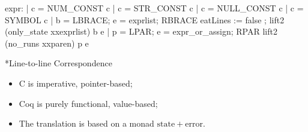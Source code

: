 \documentclass{beamer}
\begin{document}
\frame{\questiontoc}

\begin{frame}[fragile]
    \label{frame:parser}


\begin{camlcode}
expr:
  | c = NUM_CONST                       { c }
  | c = STR_CONST                       { c }
  | c = NULL_CONST                      { c }
  | c = SYMBOL                          { c }
  | b = LBRACE; e = exprlist; RBRACE
    { eatLines := false ;
      lift2 (only_state xxexprlist) b e }
  | p = LPAR; e = expr_or_assign; RPAR
    { lift2 (no_runs xxparen) p e }
\end{camlcode}

\end{frame}

\frame{\questiontoc}

\sectionframe**{Line-to-line Correspondence}{
    \label{frame:eyeball}
    \begin{itemize}
        \item C is imperative, pointer-based;
        \item Coq is purely functional, value-based;
        \item The translation is based on a monad \(\mathrm{state}+\mathrm{error}\).
    \end{itemize}
}
\end{document}
